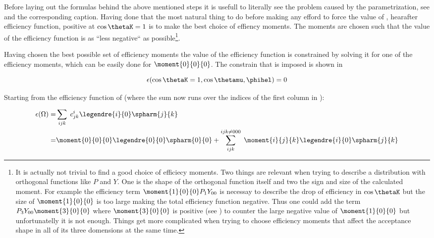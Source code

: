 Before laying out the formulas behind the above mentioned steps it is usefull to literally see the problem caused by the parametrization, see 
and the corresponding caption. Having done that the most natural thing to do before making any efford to force the value of , hearafter efficiency function,
positive at $\cos\thetaK=1$ is to make the best choice of effiency moments. The moments are chosen such that the value of the efficiency function is as ``less negative``
as 
possible\footnote{It is actually not trivial to find a good choice of efficiecy moments. Two things are relevant when trying to describe a 
distribution with orthogonal functions like $P$ and $Y$. One is the shape of the orthogonal function itself and two the sign and size of the calculated moment.
For example the efficiency term $\moment{1}{0}{0}P_1Y_{00}$ is necessay to describe the drop of efficiency in $\cos\thetaK$ but the size of $\moment{1}{0}{0}$ 
is too large making the total efficiency function negative. Thus one could add the term $P_3Y_{00}\moment{3}{0}{0}$ where $\moment{3}{0}{0}$ is positive
(see  ) to counter the large negative value of $\moment{1}{0}{0}$ but unfortunatelly it is not enough. Things get more complicated
when trying to choose efficiency moments that affect the acceptance shape in all of its three domensions at the same time.
}.

Having chosen the best possible set of efficiency moments the value of the efficiency function is constrained by solving it for
one of the efficiency moments, which can be easily done for $\moment{0}{0}{0}$. The constrain that is imposed is shown in 

\begin{center}
\begin{equation}
  \epsilon(\cos\thetaK = 1, \cos\thetamu, \phihel) = 0 
  \label{eff_func_constr}
\end{equation}
\end{center}

\noindent Starting from the efficiency function of  (where the sum now runs over the indices of the first column in ):

\begin{center}
\begin{align}
  \epsilon(\Omega) =& \sum_{ijk} \; c^i_{jk} \legendre{i}{0} \spharm{j}{k} \nonumber \\
                   =& \moment{0}{0}{0} \legendre{0}{0} \spharm{0}{0} + \sum_{ijk}^{ijk\neq 000} \; \moment{i}{j}{k} \legendre{i}{0} \spharm{j}{k}
  \label{eff_func_rewriten}
\end{align}
\end{center}

